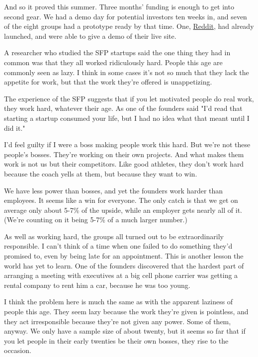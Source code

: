 And so it proved this summer.  Three months' funding is enough to
get into second gear.  We had a demo day for potential investors
ten weeks in, and seven of the eight groups had a prototype ready
by that time.  One, \href{http://reddit.com}{Reddit}, had
already launched, and were able to give a demo of their live site.

A researcher who studied the SFP startups said the one thing they 
had in common was that they all worked ridiculously hard.  People
this age are commonly seen as lazy.  I think in some cases it's not
so much that they lack the appetite for work, but that the work
they're offered is unappetizing.

The experience of the SFP suggests that if you let motivated people
do real work, they work hard, whatever their age.  As one of the
founders said "I'd read that starting a startup consumed your life,  
but I had no idea what that meant until I did it."

I'd feel guilty if I were a boss making people work this hard.  But
we're not these people's bosses.  They're working on their own
projects.  And what makes them work is not us but their competitors.
Like good athletes, they don't work hard because the coach yells
at them, but because they want to win.

We have less power than bosses, and yet the founders work harder  
than employees.  It seems like a win for everyone.  The only catch
is that we get on average only about 5-7\% of the upside, while an
employer gets nearly all of it.  (We're counting on it being 5-7\%
of a much larger number.)

As well as working hard, the groups all turned out to be extraordinarily
responsible.  I can't think of a time when one failed to do something
they'd promised to, even by being late for an appointment.  This
is another lesson the world has yet to learn.  One of the founders
discovered that the hardest part of arranging a meeting with
executives at a big cell phone carrier was getting a rental company
to rent him a car, because he was too young.

I think the problem here is much the same as with the apparent
laziness of people this age.  They seem lazy because the work they're
given is pointless, and they act irresponsible because they're not
given any power.  Some of them, anyway.  We only have a sample size
of about twenty, but it seems so far that if you let people in their
early twenties be their own bosses, they rise to the occasion.

